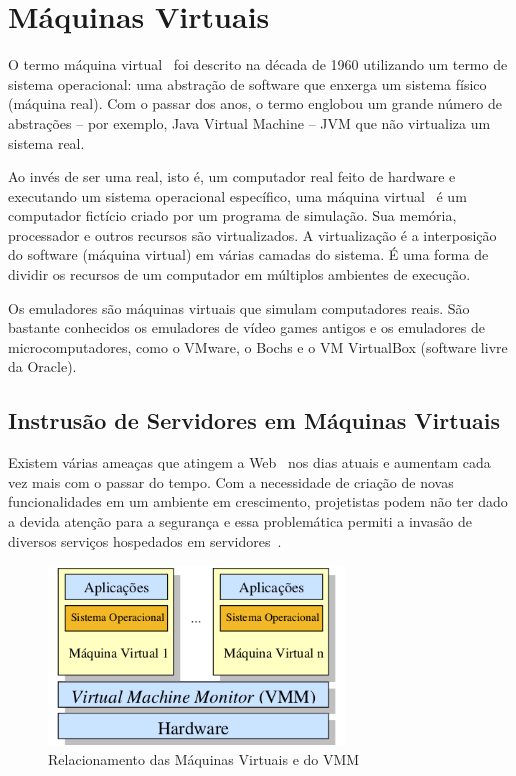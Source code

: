 \chapter{Máquinas Virtuais}

O termo máquina virtual~\cite{roland} foi descrito na década de 1960 utilizando um termo de sistema operacional: uma abstração de software que enxerga um sistema físico (máquina real). Com o passar dos anos, o termo englobou um grande número de abstrações – por exemplo, Java Virtual Machine – JVM que não virtualiza um sistema real.

Ao invés de ser uma real, isto é, um computador real feito de hardware e executando um sistema operacional específico, uma máquina virtual~\cite{jamhour} é um computador fictício criado por um programa de simulação. Sua memória, processador e outros recursos são virtualizados. A virtualização é a interposição do software (máquina virtual) em várias camadas do sistema. É uma forma de dividir os recursos de um computador em múltiplos ambientes de execução.

Os emuladores são máquinas virtuais que simulam computadores reais. São bastante conhecidos os emuladores de vídeo games antigos e os emuladores de microcomputadores, como o VMware, o Bochs e o VM VirtualBox (software livre da Oracle).

\section{Instrusão de Servidores em Máquinas Virtuais}

Existem várias ameaças que atingem a Web~\cite{kurose} nos dias atuais e aumentam cada vez mais com o passar do tempo. Com a necessidade de criação de novas funcionalidades em um ambiente em crescimento, projetistas podem não ter dado a devida atenção para a segurança e essa problemática permiti a invasão de diversos serviços hospedados em servidores~\cite{raitz}.
		
\begin{figure}
	\begin{center}
    	\includegraphics[width=0.7\textwidth]{RelacionamentoVMM}
    \end{center}
    \caption{Relacionamento das Máquinas Virtuais e do VMM~\cite{ferrazani}}
    \label{fig:RelacionamentoVMM}

\end{figure}
    
